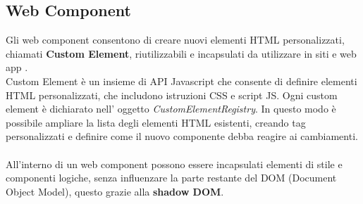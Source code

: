 \subsection{Web Component}
Gli web component consentono di creare nuovi elementi HTML personalizzati, chiamati \textbf{Custom Element}, riutilizzabili e incapsulati
da utilizzare in siti e web app \cite{webcomponents}.\\
Custom Element è un insieme di API Javascript che consente di definire elementi HTML personalizzati, che includono istruzioni CSS e script JS.
Ogni custom element è dichiarato nell' oggetto \emph{CustomElementRegistry}.
In questo modo è possibile ampliare la lista degli elementi HTML esistenti, creando 
tag personalizzati e definire come il nuovo componente debba reagire ai cambiamenti.
\\\\
All'interno di un web component possono essere incapsulati elementi di stile e componenti logiche, senza influenzare
la parte restante del DOM (Document Object Model), questo grazie alla \textbf{shadow DOM}.
